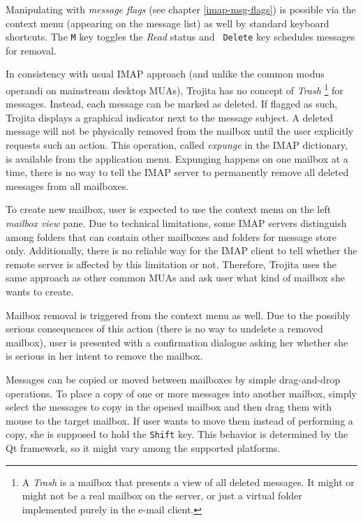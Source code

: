 \documentclass[12pt,notitlepage]{report}
\newcommand{\trojita}{Trojita\xspace}
\begin{document}
Manipulating with {\em message flags} (see chapter \ref{imap-msg-flags}) is possible
via the context menu (appearing on the message list) as well by standard
keyboard shortcuts.  The {\tt M} key toggles the {\em Read} status and {\tt
Delete} key schedules messages for removal.

In consistency with usual IMAP approach (and unlike the common modus operandi on
mainstream desktop MUAs), \trojita has no concept of {\em Trash}
\footnote{A {\em Trash} is a mailbox that presents a view of all deleted
messages.  It might or might not be a real mailbox on the server, or just a
virtual folder implemented purely in the e-mail client.} for
messages.  Instead, each message can be marked as deleted.  If flagged as such,
\trojita displays a graphical indicator next to the message subject.  A deleted
message will not be physically removed from the mailbox until the user explicitly
requests such an action.  This operation, called {\em expunge} in the IMAP
dictionary, is available from the application menu.  Expunging happens on one
mailbox at a time, there is no way to tell the IMAP server to permanently remove
all deleted messages from all mailboxes.

To create new mailbox, user is expected to use the context menu on the left {\em
mailbox view} pane.  Due to technical limitations, some IMAP servers distinguish
among folders that can contain other mailboxes and folders for message store
only.  Additionally, there is no reliable way for the IMAP client to tell
whether the remote server is affected by this limitation or not.  Therefore,
\trojita uses the same approach as other common MUAs and ask user what kind of
mailbox she wants to create.


Mailbox removal is triggered from the context menu as well.  Due to the possibly
serious consequences of this action (there is no way to undelete a removed
mailbox), user is presented with a confirmation dialogue asking her whether she
is serious in her intent to remove the mailbox.

Messages can be copied or moved between mailboxes by simple drag-and-drop
operations.  To place a copy of one or more messages into another mailbox,
simply select the messages to copy in the opened mailbox and then drag them with
mouse to the target mailbox.  If user wants to move them instead of performing a
copy, she is supposed to hold the {\tt Shift} key.  This behavior is determined
by the Qt framework, so it might vary among the supported platforms.
\end{document}
